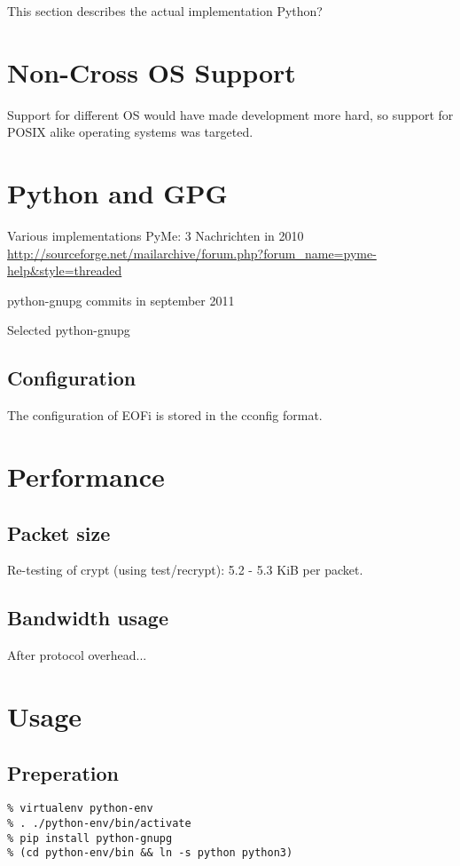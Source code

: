 This section describes the actual implementation
Python?
\section{Non-Cross OS Support}
Support for different OS would have made development more
hard, so support for POSIX alike operating systems was targeted.

\section{Python and GPG}
Various implementations \cite{python-gpg}
PyMe: 3 Nachrichten in 2010
\url{http://sourceforge.net/mailarchive/forum.php?forum_name=pyme-help&style=threaded}

python-gnupg commits in september 2011 \cite{python-gnupg}

Selected python-gnupg

\subsection{Configuration}
The configuration of EOFi is stored in the cconfig\cite{cconfig} format.


\section{Performance}
\subsection{Packet size}
Re-testing of crypt (using test/recrypt): 5.2 - 5.3 KiB per packet.

\subsection{Bandwidth usage}
After protocol overhead...

\section{Usage}

\subsection{Preperation}
\begin{verbatim}
% virtualenv python-env
% . ./python-env/bin/activate
% pip install python-gnupg
% (cd python-env/bin && ln -s python python3)
\end{verbatim}

